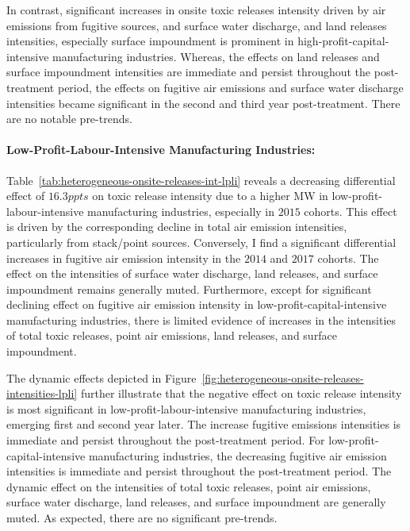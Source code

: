 \documentclass{C:/Users/david/OneDrive/Documents/ULMS/PhD/Thesis/chapter3/src/climate_change/latex/Economic_Journal/OUP-EJ}
\begin{document}
    In contrast, significant increases in onsite toxic releases intensity driven by air emissions from fugitive sources, and surface water discharge, and land releases intensities, especially surface impoundment is prominent in high-profit-capital-intensive manufacturing industries. Whereas, the effects on land releases and surface impoundment intensities are immediate and persist throughout the post-treatment period, the effects on fugitive air emissions and surface water discharge intensities became significant in the second and third year post-treatment. There are no notable pre-trends.

    \paragraph{Low-Profit-Labour-Intensive Manufacturing Industries:}
    Table~\ref{tab:heterogeneous-onsite-releases-int-lpli} reveals a decreasing differential effect of $16.3ppts$ on toxic release intensity due to a higher MW in low-profit-labour-intensive manufacturing industries, especially in $2015$ cohorts. This effect is driven by the corresponding decline in total air emission intensities, particularly from stack/point sources. Conversely, I find a significant differential increases in fugitive air emission intensity in the $2014$ and $2017$ cohorts. The effect on the intensities of surface water discharge, land releases, and surface impoundment remains generally muted. Furthermore, except for significant declining effect on fugitive air emission intensity in low-profit-capital-intensive manufacturing industries, there is limited evidence of increases in the intensities of total toxic releases, point air emissions, land releases, and surface impoundment.
    

    The dynamic effects depicted in Figure~\ref{fig:heterogeneous-onsite-releases-intensities-lpli} further illustrate that the negative effect on toxic release intensity is most significant in low-profit-labour-intensive manufacturing industries, emerging first and second year later. The increase fugitive emissions intensities is immediate and persist throughout the post-treatment period. For low-profit-capital-intensive manufacturing industries, the decreasing fugitive air emission intensities is immediate and persist throughout the post-treatment period. The dynamic effect on the intensities of total toxic releases, point air emissions, surface water discharge, land releases, and surface impoundment are generally muted. As expected, there are no significant pre-trends.
    
\end{document}
